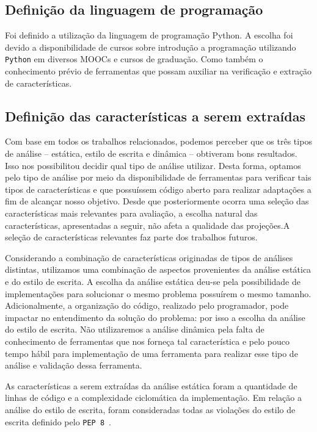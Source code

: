 		\subsection{Definição da linguagem de programação}
		
			Foi definido a utilização da linguagem de programação Python. A escolha foi
			devido a disponibilidade de cursos sobre introdução a programação utilizando
			\texttt{Python} em diversos \acs{MOOC}s e cursos de graduação. Como também
			o conhecimento prévio de ferramentas que possam auxiliar na verificação
			e extração de características.

		\subsection{Definição das características a serem extraídas}

			Com base em todos os trabalhos relacionados, podemos perceber que os três
			tipos de análise -- estática, estilo de escrita e dinâmica -- obtiveram
			bons resultados. Isso nos possibilitou decidir qual tipo de análise
			utilizar. Desta forma, optamos pelo tipo de análise por meio da disponibilidade
			de ferramentas para verificar tais tipos de características e que possuíssem
			código aberto para realizar adaptações a fim de alcançar nosso objetivo.
			Desde que posteriormente ocorra uma seleção das características mais relevantes
			para avaliação, a escolha natural das características, apresentadas a seguir,
			não	afeta a qualidade das projeções.A seleção de características relevantes
			faz parte dos trabalhos futuros.

			Considerando a combinação de características originadas de tipos de análises
			distintas, utilizamos uma combinação de aspectos provenientes da análise  
			estática e do estilo de escrita. A escolha da análise estática deu-se pela
			possibilidade de implementações para solucionar o mesmo problema possuírem
			o mesmo tamanho. Adicionalmente, a organização do código, realizado pelo programador,
			pode impactar no entendimento da solução do problema: por isso a escolha da
			análise do estilo de escrita.  Não utilizaremos a análise dinâmica pela falta
			de conhecimento de ferramentas que nos forneça tal característica e pelo pouco
			tempo hábil para implementação de uma ferramenta para realizar esse tipo de
			análise e validação dessa ferramenta.
			
			As características a serem extraídas da análise estática foram a quantidade
			de linhas de código e a complexidade ciclomática da implementação. Em relação
			a análise do estilo de escrita, foram consideradas todas as violações do estilo de
			escrita definido pelo \texttt{PEP 8}~\cite{van2001pep}. 

